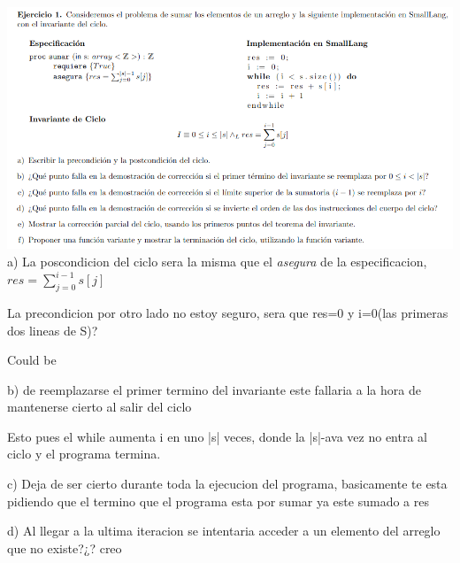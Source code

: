 \documentclass[a4paper,10pt]{article}
\begin{document}
\includegraphics[width=\textwidth]{e1.png}
a) La poscondicion del ciclo sera la misma que el \emph{asegura} de la especificacion, $res=\sum_{j=0}^{i-1}s[j]$

La precondicion por otro lado no estoy seguro, sera que res=0 y i=0(las primeras dos lineas de S)?

Could be

b) de reemplazarse el primer termino del invariante este fallaria a la hora de mantenerse cierto al salir del ciclo

Esto pues el while aumenta i en uno |s| veces, donde la |s|-ava vez no entra al ciclo y el programa termina.

c) Deja de ser cierto durante toda la ejecucion del programa, basicamente te esta pidiendo que el termino que el programa esta por sumar ya este sumado a res

d) Al llegar a la ultima iteracion se intentaria acceder a un elemento del arreglo que no existe?¿? creo
\end{document}
